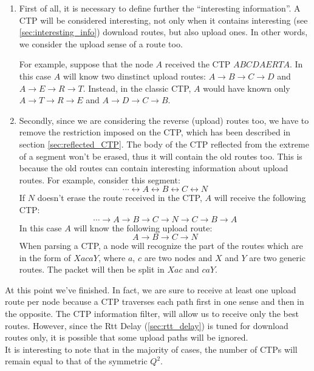 \documentclass[a4paper]{article}
\begin{document}
\begin{enumerate}
	\item	First of all, it is necessary to define further the ``interesting
		information''. A CTP will be considered interesting, not only when it contains
		interesting (see \ref{sec:interesting_info}) download routes, but also upload
		ones. In other words, we consider the upload sense of a route too. 

		For example, suppose that the node $A$ received the CTP $ABCDAERTA$. In this
		case $A$ will know two dinstinct upload routes: $A\rightarrow B\rightarrow
		C\rightarrow D$ and $A\rightarrow E\rightarrow R\rightarrow T$. Instead, in
		the classic CTP, $A$ would have known only $A\rightarrow T\rightarrow
		R\rightarrow E$ and $A\rightarrow D\rightarrow C\rightarrow B$.
	\item Secondly, since we are considering the reverse (upload) routes
		too, we have to remove the restriction imposed on the CTP,
		which has been described in section \ref{sec:reflected_CTP}.
                The body of the CTP reflected from the extreme of a segment
                won't be erased, thus it will contain the old routes too.
		This is because the old routes can contain interesting
		information about upload routes.
		For example, consider this segment:
		\[ \cdots \leftrightarrow A \leftrightarrow B \leftrightarrow C \leftrightarrow N \]
		If $N$ doesn't erase the route received in the CTP, $A$ will
		receive the following CTP:
		\[
		\cdots \rightarrow A \rightarrow B \rightarrow C \rightarrow N \rightarrow C \rightarrow B \rightarrow A
		\]
		In this case $A$ will know the following upload route:
		\[
			A \rightarrow B \rightarrow C \rightarrow N
		\]
		When parsing a CTP, a node will recognize the part of the
		routes which are in the form of $XacaY$, where $a$, $c$ are
		two nodes and $X$ and $Y$ are two generic routes. The packet
		will then be split in $Xac$ and $caY$.
\end{enumerate}
At this point we've finished. In fact, we are sure to receive at least one
upload route per node because a CTP traverses each path first in one sense
and then in the opposite. The CTP information filter, will allow us
to receive only the best routes. However, since the Rtt Delay
(\ref{sec:rtt_delay}) is tuned for download routes only, it is possible that
some upload paths will be ignored.\\
It is interesting to note that in the majority of cases, the number of
CTPs will remain equal to that of the symmetric $Q^2$.
\end{document}
